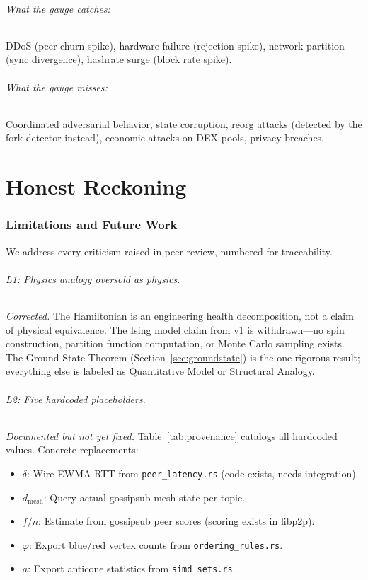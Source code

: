 \documentclass[11pt,a4paper]{article}
\begin{document}
\paragraph{What the gauge catches:} DDoS (peer churn spike), hardware failure (rejection spike), network partition (sync divergence), hashrate surge (block rate spike).

\paragraph{What the gauge misses:} Coordinated adversarial behavior, state corruption, reorg attacks (detected by the fork detector instead), economic attacks on DEX pools, privacy breaches.

\part{Honest Reckoning}

\section{Limitations and Future Work}
\label{sec:limitations}

We address every criticism raised in peer review, numbered for traceability.

\paragraph{L1: Physics analogy oversold as physics.} \emph{Corrected.} The Hamiltonian is an engineering health decomposition, not a claim of physical equivalence. The Ising model claim from v1 is withdrawn---no spin construction, partition function computation, or Monte Carlo sampling exists. The Ground State Theorem (Section~\ref{sec:groundstate}) is the one rigorous result; everything else is labeled as Quantitative Model or Structural Analogy.

\paragraph{L2: Five hardcoded placeholders.} \emph{Documented but not yet fixed.} Table~\ref{tab:provenance} catalogs all hardcoded values. Concrete replacements:
\begin{itemize}[nosep]
    \item $\delta$: Wire EWMA RTT from \texttt{peer\_latency.rs} (code exists, needs integration).
    \item $d_{\text{mesh}}$: Query actual gossipsub mesh state per topic.
    \item $f/n$: Estimate from gossipsub peer scores (scoring exists in libp2p).
    \item $\varphi$: Export blue/red vertex counts from \texttt{ordering\_rules.rs}.
    \item $\bar{a}$: Export anticone statistics from \texttt{simd\_sets.rs}.
\end{itemize}
\end{document}
